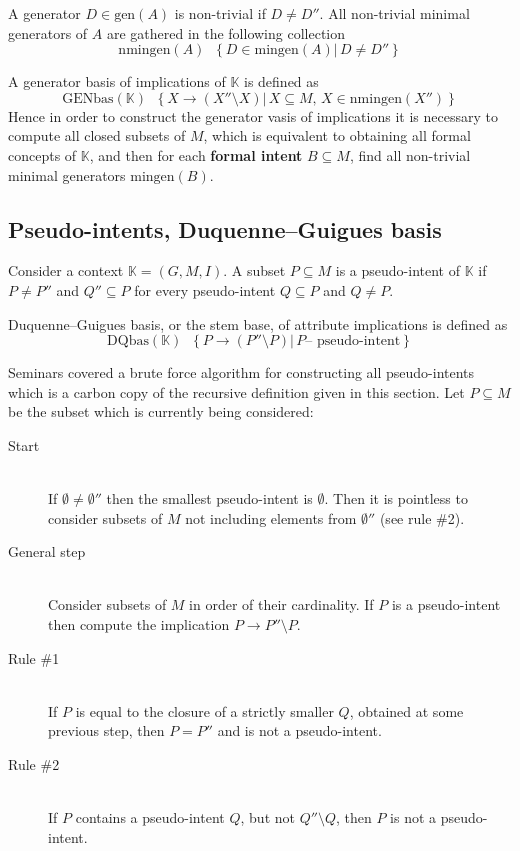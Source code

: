 \documentclass[a4paper]{article}
\newcommand{\obj}[1]{{\left\{ #1 \right \}}}
\newcommand{\brac}[1]{{\left ( #1 \right )}}
\newcommand{\induc}[1]{{\left . #1 \right \vert}}
\newcommand{\Ctx}{\mathbb{K}}
\newcommand{\defn}{\mathop{\overset{\Delta}{=}}\nolimits}
\begin{document}
A generator $D\in\text{gen}(A)$ is non-trivial if $D\neq D''$. All non-trivial minimal generators of $A$ are gathered in the following collection \[\text{nmingen}(A) \defn \obj{\induc{D\in\text{mingen}(A)}\,D\neq D'' }\]

A generator basis of implications of $\Ctx$ is defined as \[\text{GENbas}(\Ctx)\defn \obj{\induc{ X\to \brac{X''\setminus X} }\, X\subseteq M,\, X\in \text{nmingen}(X'')}\] Hence in order to construct the generator vasis of implications it is necessary to compute all closed subsets of $M$, which is equivalent to obtaining all formal concepts of $\Ctx$, and then for each \textbf{formal intent} $B\subseteq M$, find all non-trivial minimal generators $\text{mingen}(B)$.



\subsection{Pseudo-intents, Duquenne–Guigues basis} %
\label{sub:pseudointents}

Consider a context $\Ctx=\brac{G,M,I}$. A subset $P\subseteq M$ is a pseudo-intent of $\Ctx$ if $P\neq P''$ and $Q''\subseteq P$ for every pseudo-intent $Q\subseteq P$ and $Q\neq P$.

Duquenne–Guigues basis, or the stem base, of attribute implications is defined as \[\text{DQbas}(\Ctx)\defn \obj{\induc{ P\to \brac{P''\setminus P} }\, P \text{-- pseudo-intent} }\]

Seminars covered a brute force algorithm for constructing all pseudo-intents which is a carbon copy of the recursive definition given in this section. Let $P\subseteq M$ be the subset which is currently being considered: \begin{description}
	\item[Start] \hfill \\ If $\emptyset\neq \emptyset''$ then the smallest pseudo-intent is $\emptyset$. Then it is pointless to consider subsets of $M$ not including elements from $\emptyset''$ (see rule \#2).
	\item[General step] \hfill \\ Consider subsets of $M$ in order of their cardinality. If $P$ is a pseudo-intent then compute the implication $P\to P''\setminus P$.
	\item[Rule \#1]\hfill \\ If $P$ is equal to the closure of a strictly smaller $Q$, obtained at some previous step, then $P=P''$ and is not a pseudo-intent.
	\item[Rule \#2]\hfill \\ If $P$ contains a pseudo-intent $Q$, but not $Q''\setminus Q$, then $P$ is not a pseudo-intent.
\end{description}
\end{document}
